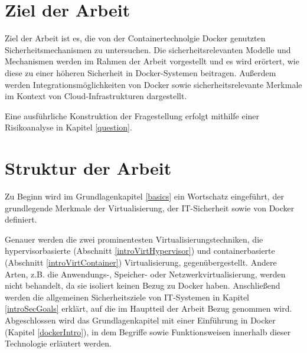 \documentclass[../main.tex]{subfiles}
\begin{document}


  \section{Ziel der Arbeit}
    Ziel der Arbeit ist es, die von der Containertechnolgie Docker genutzten Sicherheitsmechanismen zu untersuchen. Die sicherheitsrelevanten Modelle und Mechanismen werden im Rahmen der Arbeit vorgestellt und es wird erörtert, wie diese zu einer höheren Sicherheit in Docker-Systemen beitragen.
    Außerdem werden Integrationsmöglichkeiten von Docker sowie sicherheitsrelevante Merkmale im Kontext von Cloud-Infrastrukturen dargestellt.

    Eine ausführliche Konstruktion der Fragestellung erfolgt mithilfe einer Risikoanalyse in Kapitel \ref{question}.

  \section{Struktur der Arbeit}
    Zu Beginn wird im Grundlagenkapitel \ref{basics} ein Wortschatz eingeführt, der grundlegende Merkmale der Virtualisierung, der IT-Sicherheit sowie von Docker definiert.

    Genauer werden die zwei prominentesten Virtualisierungstechniken, die hypervisorbasierte (Abschnitt \ref{introVirtHypervisor}) und containerbasierte (Abschnitt \ref{introVirtContainer}) Virtualisierung, gegenübergestellt. Andere Arten, z.B. die Anwendungs-, Speicher- oder Netzwerkvirtualisierung, werden nicht behandelt, da sie isoliert keinen Bezug zu Docker haben.  %
    Anschließend werden die allgemeinen Sicherheitsziele von \acrshort{IT}-Systemen in Kapitel \ref{introSecGoals} erklärt, auf die im Hauptteil der Arbeit Bezug genommen wird. Abgeschlossen wird das Grundlagenkapitel mit einer Einführung in Docker (Kapitel \ref{dockerIntro}), in dem Begriffe sowie Funktionsweisen innerhalb dieser Technologie erläutert werden.
\end{document}
